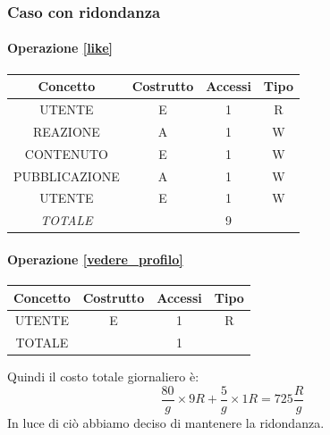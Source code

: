 \documentclass[a4paper,12pt]{report}
\begin{document}
\subsubsection{Caso con ridondanza}
\begin{table}[h]
  \paragraph{Operazione \ref{like}\newline}
\begin{tabular}{|c|c|c|c|}
\hline
Concetto        & Costrutto & Accessi & Tipo \\ \hline
UTENTE          & E         & 1       & R    \\ \hline
REAZIONE        & A         & 1       & W    \\ \hline
CONTENUTO       & E         & 1       & W    \\ \hline
PUBBLICAZIONE   & A         & 1       & W    \\ \hline 
UTENTE          & E         & 1       & W    \\ \hline
\textit{TOTALE} &           & 9       &      \\ \hline
\end{tabular}
\end{table}

\begin{table}[H]
  \paragraph{Operazione \ref{vedere_profilo}\newline}
\begin{tabular}{|c|c|c|c|}
\hline
Concetto & Costrutto & Accessi & Tipo \\ \hline
UTENTE   & E         & 1       & R    \\ \hline
TOTALE   &           & 1       &      \\ \hline
\end{tabular}
\end{table}
Quindi il costo totale giornaliero è:
\begin{equation}
  \frac{80} g \times 9 R + \frac{5} {g} \times 1 R = 725 \frac{R} g 
\end{equation}
In luce di ciò abbiamo deciso di mantenere la ridondanza.
\end{document}
